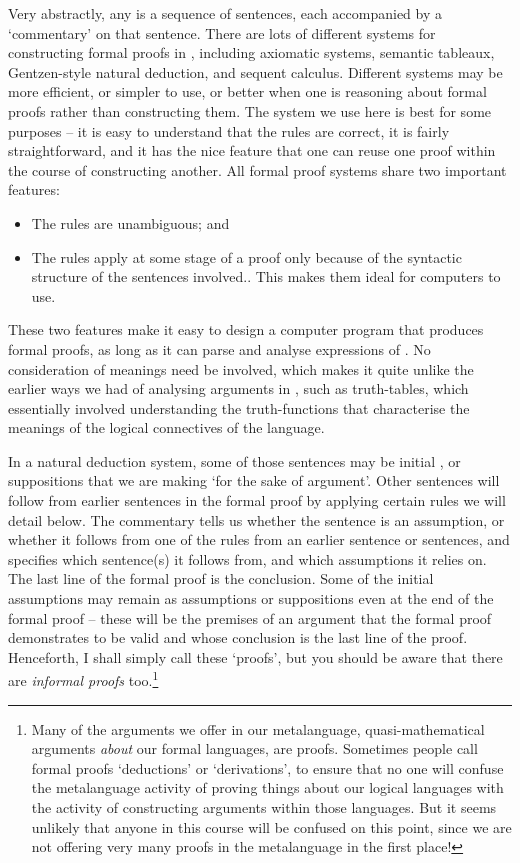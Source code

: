 Very abstractly, any  is a sequence of sentences, each accompanied by a `commentary' on that sentence. There are lots of different systems for constructing formal proofs in \TFL, including axiomatic systems, semantic tableaux, Gentzen-style natural deduction, and sequent calculus. Different systems may be more efficient, or simpler to use, or better when one is reasoning about formal proofs rather than constructing them. The system we use here is best for some purposes – it is easy to understand that the rules are correct, it is fairly straightforward, and it has the nice feature that one can reuse one proof within the course of constructing another. All formal proof systems share two important features: \begin{itemize}
	\item The rules are unambiguous; and
	\item The rules apply at some stage of a proof only because of the syntactic structure of the sentences involved.. This makes them ideal for computers to use. 
\end{itemize} These two features make it easy to design a computer program that produces formal proofs, as long as it can parse and analyse expressions of \TFL. No consideration of meanings need be involved, which makes it quite unlike the earlier ways we had of analysing arguments in \TFL, such as truth-tables, which essentially involved understanding the truth-functions that characterise the meanings of the logical connectives of the language.

 In a natural deduction system, some of those sentences may be initial , or suppositions that we are making `for the sake of argument'. Other sentences will follow from earlier sentences in the formal proof by applying certain rules we will detail below. The commentary tells us whether the sentence is an assumption, or whether it follows from one of the rules from an earlier sentence or sentences, and specifies which sentence(s) it follows from, and which assumptions it relies on. The last line of the formal proof is the conclusion. Some of the initial assumptions may remain as assumptions or suppositions even at the end of the formal proof –  these  will be the premises of an argument that the formal proof demonstrates to be valid and whose conclusion is the last line of the proof. Henceforth, I shall simply call these `proofs', but you should be aware that there are \emph{informal proofs} too.\footnote{Many of the arguments we offer in our metalanguage, quasi-mathematical arguments \emph{about} our formal languages, are proofs. Sometimes people call formal proofs `deductions' or `derivations', to ensure that no one will confuse the metalanguage activity of proving things about our logical languages with the activity of constructing arguments within those languages. But it seems unlikely that anyone in this course will be confused on this point, since we are not offering very many proofs in the metalanguage in the first place!}

